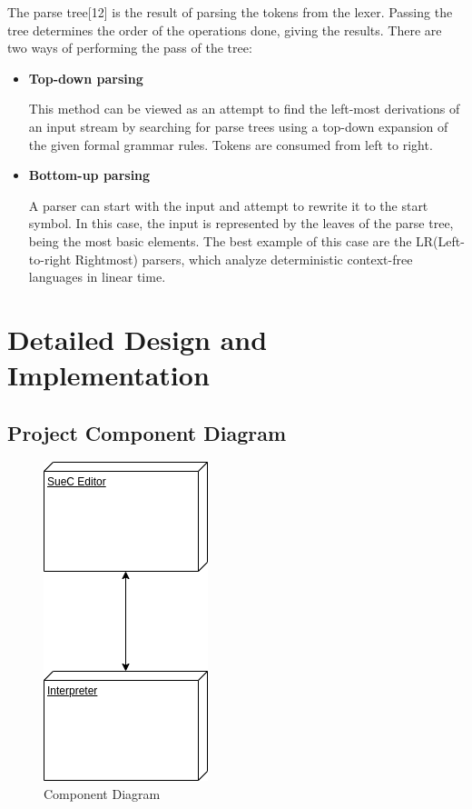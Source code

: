 \documentclass[12pt,a4paper,twoside]{report}
\begin{document}
 	The parse tree[12] is the result of parsing the tokens from the lexer. Passing the tree determines the order of the operations done, giving the results. There are two ways of performing the pass of the tree:
 	
 	\begin{itemize}
 		\item \textbf{Top-down parsing}
 		
 		This method can be viewed as an attempt to find the left-most derivations of an input stream by searching for parse trees using a top-down expansion of the given formal grammar rules. Tokens are consumed from left to right.
 		
 		\item \textbf{Bottom-up parsing}
 		
 		A parser can start with the input and attempt to rewrite it to the start symbol. In this case, the input is represented by the leaves of the parse tree, being the most basic elements. The best example of this case are the LR(Left-to-right Rightmost) parsers, which analyze deterministic context-free languages in linear time.
 	\end{itemize}

\chapter{Detailed Design and Implementation}

\section{Project Component Diagram}
\begin{figure}[h]
 \centering
 \includegraphics[scale=0.6]{img/diags/CompDiag.png}
 \caption{Component Diagram}
\end{figure}
\end{document}
